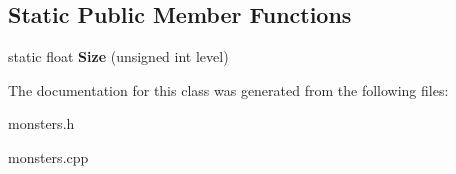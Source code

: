 \subsection*{\-Static \-Public \-Member \-Functions}
\begin{DoxyCompactItemize}
\item 
\hypertarget{classMonsters_a9eb8cff820a8d541ad6f623b0ae08f36}{static float {\bfseries \-Size} (unsigned int level)}\label{classMonsters_a9eb8cff820a8d541ad6f623b0ae08f36}

\end{DoxyCompactItemize}


\-The documentation for this class was generated from the following files\-:\begin{DoxyCompactItemize}
\item 
monsters.\-h\item 
monsters.\-cpp\end{DoxyCompactItemize}
